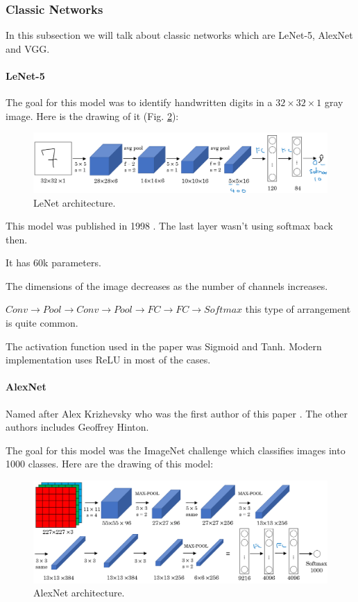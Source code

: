 \subsubsection{Classic Networks}
In this subsection we will talk about classic networks which are LeNet-5, AlexNet and VGG.

\paragraph{LeNet-5} The goal for this model was to identify handwritten digits in a $32\times 32\times 1$ gray image. Here is the drawing of it (Fig. \ref{lenet}):

\begin{figure}[!htbp]
    \centering
    \includegraphics[width=1.0\textwidth]{img/c4/lenet.png}
    \caption{LeNet architecture.}
    \label{lenet}
\end{figure}

This model was published in 1998 \cite{lecun1998gradient}. The last layer wasn't using softmax back then.

It has 60k parameters.

The dimensions of the image decreases as the number of channels increases.

$Conv \to Pool \to Conv \to Pool \to FC \to FC \to Softmax$ this type of arrangement is quite common.

The activation function used in the paper was Sigmoid and Tanh. Modern implementation uses ReLU in most of the cases.

\paragraph{AlexNet} Named after Alex Krizhevsky who was the first author of this paper \cite{krizhevsky2012imagenet}. The other authors includes Geoffrey Hinton.

The goal for this model was the ImageNet challenge which classifies images into 1000 classes. Here are the drawing of this model:

\begin{figure}[!htbp]
    \centering
    \includegraphics[width=1.0\textwidth]{img/c4/alexnet.png}
    \caption{AlexNet architecture.}
    \label{lenet}
\end{figure}

